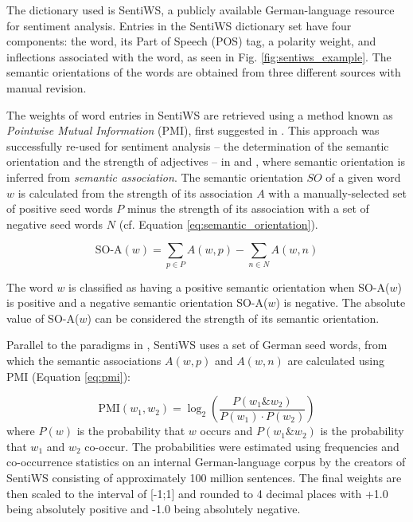 \documentclass[10pt,twocolumn,twoside]{layout}
\begin{document}
The dictionary used is SentiWS, a publicly available German-language resource for sentiment analysis. \cite{REMUS10.490} Entries in the SentiWS dictionary set have four components: the word, its Part of Speech (POS) tag, a polarity weight, and inflections associated with the word, as seen in Fig. \ref{fig:sentiws_example}. The semantic orientations of the words are obtained from three different sources with manual revision. 

The weights of word entries in SentiWS are retrieved using a method known as \emph{Pointwise Mutual Information} (PMI), first suggested in \cite{church-hanks-1990-word}. This approach was successfully re-used for sentiment analysis -- the determination of the semantic orientation and the strength of adjectives -- in \cite{Turney2002} and \cite{Turney2003}, where semantic orientation is inferred from \emph{semantic association}. The semantic orientation \(SO\) of a given word \(w\) is calculated from the strength of its association \(A\) with a manually-selected set of positive seed words \(P\) minus the strength of its association with a set of negative seed words \(N\) (cf. Equation \ref{eq:semantic_orientation}). 

\begin{equation}
\label{eq:semantic_orientation}
\text{SO-A}(w) = \sum_{p \in P}A(w,p) - \sum_{n \in N}A(w,n)
\end{equation}

The word \(w\) is classified as having a positive semantic orientation when SO-A(\(w\)) is positive and a negative semantic orientation SO-A(\(w\)) is negative. The absolute value of SO-A(\(w\)) can be considered the strength of its semantic orientation. 

Parallel to the paradigms in \cite{Turney2003}, SentiWS uses a set of German seed words, from which the semantic associations \(A(w,p)\) and \(A(w,n)\) are calculated using PMI (Equation \ref{eq:pmi}): 

\begin{equation}
\label{eq:pmi}
\text{PMI}(w_1,w_2) = \log_2\left(\frac{P(w_1 \& w_2)}{P(w_1) \cdot P(w_2)}\right)
\end{equation}
where \(P(w)\) is the probability that \(w\) occurs and \(P(w_1 \& w_2)\) is the probability that \(w_1\) and \(w_2\) co-occur. The probabilities were estimated using frequencies and co-occurrence statistics on an internal German-language corpus by the creators of SentiWS consisting of approximately 100 million sentences. The final weights are then scaled to the interval of [-1;1] and rounded to 4 decimal places with +1.0 being absolutely positive and -1.0 being absolutely negative.
\end{document}
